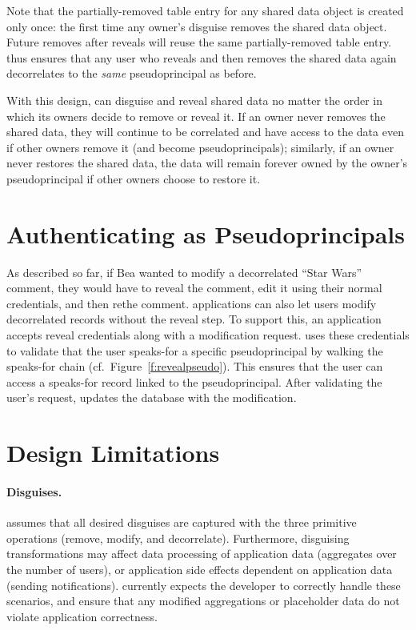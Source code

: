 Note that the partially-removed table entry for any shared data object is
created only once: the first time any owner's disguise removes the shared data
object. Future removes after reveals will reuse the same partially-removed table
entry.
%
\sys thus ensures that any user who reveals and then removes the shared data
again decorrelates to the \emph{same} pseudoprincipal as before.

%
With this design, \sys can disguise and reveal shared data no matter the order
in which its owners decide to remove or reveal it. If an owner never removes the
shared data, they will continue to be correlated and have access to the data
even if other owners remove it (and become pseudoprincipals); similarly, if an
owner never restores the shared data, the data will remain forever owned by the
owner's pseudoprincipal if other owners choose to restore it.
%





\section{Authenticating as Pseudoprincipals}

As described so far, if Bea wanted to modify a decorrelated ``Star Wars''
comment, they would have to reveal the comment, edit it using their normal
credentials, and then re\xx the comment.
%
\sys applications can also let users modify decorrelated records without the
reveal step.
%
To support this, an application accepts reveal credentials along with a
modification request. \sys uses these credentials to validate that the user
speaks-for a specific pseudoprincipal by walking the speaks-for chain (cf.\
Figure~\ref{f:revealpseudo}). This ensures that the user can access a speaks-for
record linked to the pseudoprincipal. After validating the user's request, \sys updates
the database with the modification.
%
%

\section{Design Limitations}
\label{s:design:limits}

\paragraph{Disguises.}
\sys assumes that all desired disguises are captured with the three primitive
operations (remove, modify, and decorrelate).
%
Furthermore, disguising transformations may affect data processing of
application data (\eg aggregates over the number of users), or application side
effects dependent on application data (\eg sending notifications).  \sys
currently expects the developer to correctly handle these scenarios, and ensure
that any modified aggregations or placeholder data do not violate application
correctness.
%


